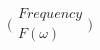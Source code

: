 \documentclass[preview]{standalone}
\begin{document}
\begin{align*}
\big(\begin{array}{c} Frequency \\ F(\omega) \end{array})
\end{align*}
\end{document}

